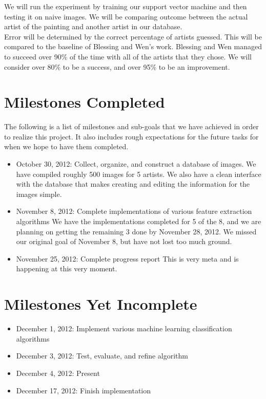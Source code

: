 \documentclass{article}
\begin{document}
We will run the experiment by training our support vector machine and
then testing it on naive images. We will be comparing outcome between the
actual artist of the painting and another artist in our database. \\

Error will be determined by the correct percentage of artists guessed. This
will be compared to the baseline of Blessing and Wen's work. Blessing and Wen
managed to succeed over 90\% of the time with all of the artists that they
chose. We will consider over 80\% to be a success, and over 95\% to be an
improvement.

\section{Milestones Completed}
The following is a list of milestones and sub-goals that we have achieved in
order to realize this project. It also includes rough expectations for the
future tasks for when we hope to have them completed. \\ 

\begin{itemize}
  \item October 30, 2012: Collect, organize, and construct a database of images.
  We have compiled roughly 500 images for 5 artists. We also have a clean
  interface with the database that makes creating and editing the information
  for the images simple.

  \item November 8, 2012: Complete implementations of various feature extraction
  algorithms
  We have the implementations completed for 5 of the 8, and we are planning on
  getting the remaining 3 done by November 28, 2012. We missed our original
  goal of November 8, but have not lost too much ground.

  \item November 25, 2012: Complete progress report
  This is very meta and is happening at this very moment.
\end{itemize}

\section{Milestones Yet Incomplete}
\begin{itemize}
  \item December 1, 2012: Implement various machine learning classification
  algorithms
  \item December 3, 2012: Test, evaluate, and refine algorithm
  \item December 4, 2012: Present
  \item December 17, 2012: Finish implementation
\end{itemize}
\end{document}
